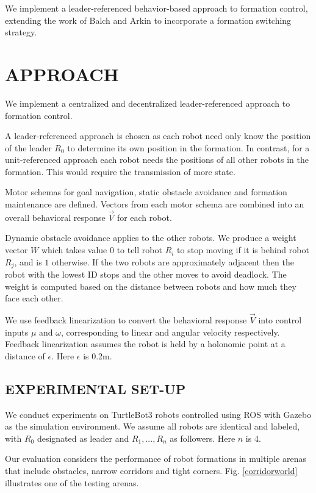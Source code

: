 \documentclass[letterpaper, 10 pt, conference]{ieeeconf}  %
\begin{document}
We implement a leader-referenced behavior-based approach to formation control, extending the work of Balch and Arkin to incorporate a formation switching strategy.

\section{APPROACH}

We implement a centralized and decentralized leader-referenced approach to formation control. 

A leader-referenced approach is chosen as each robot need only know the position of the leader $R_0$ to determine its own position in the formation. In contrast, for a unit-referenced approach each robot needs the positions of all other robots in the formation. This would require the transmission of more state.

Motor schemas for goal navigation, static obstacle avoidance and formation maintenance are defined. Vectors from each motor schema are combined into an overall behavioral response $\vec{V}$ for each robot.

Dynamic obstacle avoidance applies to the other robots. We produce a weight vector $W$ which takes value $0$ to tell robot $R_i$ to stop moving if it is behind robot $R_j$, and is $1$ otherwise. If the two robots are approximately adjacent then the robot with the lowest ID stops and the other moves to avoid deadlock. The weight is computed based on the distance between robots and how much they face each other.

We use feedback linearization to convert the behavioral response $\vec{V}$ into control inputs $\mu$ and $\omega$, corresponding to linear and angular velocity respectively. Feedback linearization assumes the robot is held by a holonomic point at a distance of $\epsilon$. Here $\epsilon$ is 0.2m.

\subsection{EXPERIMENTAL SET-UP}

We conduct experiments on TurtleBot3 \cite{turtlebot} robots controlled using ROS \cite{ros} with Gazebo \cite{gazebo} as the simulation environment. We assume all robots are identical and labeled, with $R_0$ designated as leader and $R_1,...,R_n$ as followers. Here $n$ is 4.

Our evaluation considers the performance of robot formations in multiple arenas that include obstacles, narrow corridors and tight corners. Fig. \ref{corridorworld} illustrates one of the testing arenas.
\end{document}
